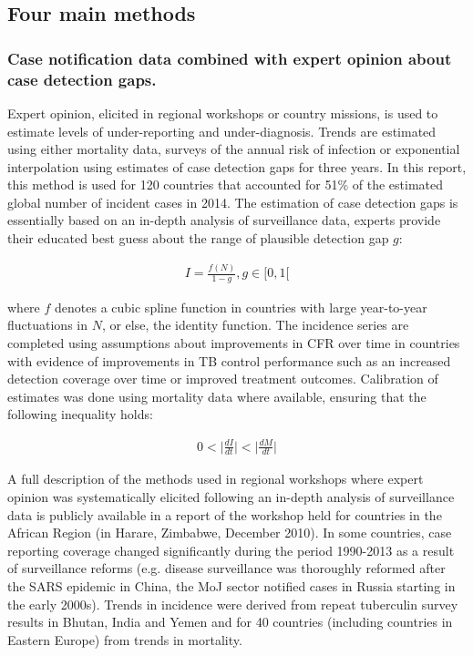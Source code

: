 \subsection {Four main methods}

\subsubsection {Case notification data combined with expert opinion about case detection gaps.} Expert opinion, elicited in regional workshops or country missions, is used to estimate levels of under-reporting and under-diagnosis. Trends are estimated using either mortality data, surveys of the annual risk of infection or exponential interpolation using estimates of case detection gaps for three years. In this report, this method is used for 120 countries that accounted for 51\% of the estimated global number of incident cases in 2014. The estimation of case detection gaps is essentially based on an in-depth analysis of surveillance data, experts provide their educated best guess about the range of plausible detection gap $g$:

\begin{align*}
I=\frac{f(N)}{1-g}, g\in[0,1[
\end{align*}

where $f$ denotes a cubic spline function in countries with large year-to-year fluctuations in $N$, or else, the identity function. The incidence series are completed using assumptions about improvements in CFR over time in countries with evidence of improvements in TB control performance such as an increased detection coverage over time or improved treatment outcomes. Calibration of estimates was done using mortality data where available, ensuring that the following inequality holds: 

\begin{align*}
0 < \lvert \frac{dI}{dt} \rvert < \lvert \frac{dM}{dt} \rvert 
\end{align*}

A full description of the methods used in regional workshops where expert opinion was systematically elicited following an in-depth analysis of surveillance data is publicly available in a report of the workshop held for countries in the African Region (in Harare, Zimbabwe, December 2010\cite{WHO}). In some countries, case reporting coverage changed significantly during the period 1990-2013 as a result of surveillance reforms (e.g. disease surveillance was thoroughly reformed after the SARS epidemic in China, the MoJ sector notified cases in Russia starting in the early 2000s). Trends in incidence were derived from repeat tuberculin survey results in Bhutan, India and Yemen and for 40 countries (including countries in Eastern Europe) from trends in mortality. 

